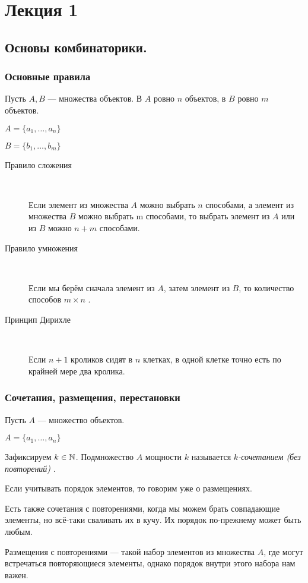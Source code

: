 \chapter{ Лекция 1 }
\section{Основы комбинаторики.}
\subsection{Основные правила}

 
Пусть $A, B$ --- множества объектов. В $A$ ровно $n$ объектов, в $B$ ровно $m$ объектов.

 $A =  \{ a_1, \dots, a_n \} $ 
 
 $B =  \{ b_1, \dots, b_m \} $
 
\begin{description}
\item[Правило сложения]~ 

Если элемент из множества $A$ можно выбрать $n$ способами, а элемент из множества $B$ можно выбрать m способами, то выбрать элемент из  $A$ или из $B$ можно $n+m$ способами.
\item[Правило умножения]  ~

Если мы берём сначала элемент из $A$, затем элемент из $B$, то количество способов $m \times n $ .
\item[Принцип Дирихле] ~

Если $n+1$ кроликов сидят в $n$ клетках, в одной клетке точно есть по крайней мере два кролика. 
\end{description}

\subsection{Сочетания, размещения, перестановки}

Пусть $A$ --- множество объектов. 

$A =  \{ a_1, \dots, a_n \}$

Зафиксируем $k \in \mathbb{N} $. Подмножество $A$ мощности $k$ называется \textit{ $k$-сочетанием (без повторений) } . 

Если учитывать порядок элементов, то говорим уже о размещениях.

Есть также сочетания с повторениями, когда мы можем брать совпадающие элементы, но всё-таки сваливать их в кучу. Их порядок по-прежнему может быть любым.

Размещения с повторениями --- такой набор элементов из множества $A$, где могут встречаться повторяющиеся элементы, однако порядок внутри этого набора нам важен. 

